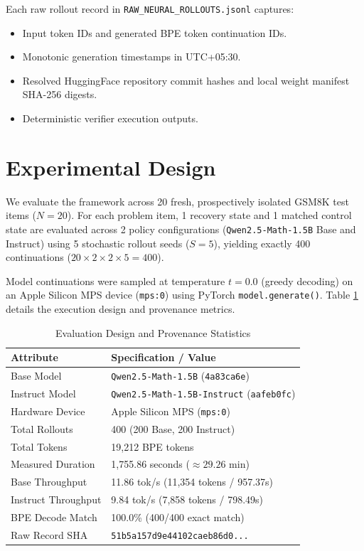 \documentclass[conference]{IEEEtran}
\begin{document}
Each raw rollout record in \texttt{RAW\_NEURAL\_ROLLOUTS.jsonl} captures:
\begin{itemize}
    \item Input token IDs and generated BPE token continuation IDs.
    \item Monotonic generation timestamps in UTC+05:30.
    \item Resolved HuggingFace repository commit hashes and local weight manifest SHA-256 digests.
    \item Deterministic verifier execution outputs.
\end{itemize}

\section{Experimental Design}
We evaluate the framework across 20 fresh, prospectively isolated GSM8K test items ($N=20$). For each problem item, 1 recovery state and 1 matched control state are evaluated across 2 policy configurations (\texttt{Qwen2.5-Math-1.5B} Base and Instruct) using 5 stochastic rollout seeds ($S=5$), yielding exactly 400 continuations ($20 \times 2 \times 2 \times 5 = 400$).

Model continuations were sampled at temperature $t=0.0$ (greedy decoding) on an Apple Silicon MPS device (\texttt{mps:0}) using PyTorch \texttt{model.generate()}. Table \ref{tab:provenance} details the execution design and provenance metrics.

\begin{table}[htbp]
\caption{Evaluation Design and Provenance Statistics}
\label{tab:provenance}
\centering
\begin{tabularx}{\columnwidth}{Xp{4.2cm}}
\toprule
\textbf{Attribute} & \textbf{Specification / Value} \\
\midrule
Base Model & \texttt{Qwen2.5-Math-1.5B} (\texttt{4a83ca6e}) \\
Instruct Model & \texttt{Qwen2.5-Math-1.5B-Instruct} (\texttt{aafeb0fc}) \\
Hardware Device & Apple Silicon MPS (\texttt{mps:0}) \\
Total Rollouts & 400 (200 Base, 200 Instruct) \\
Total Tokens & 19,212 BPE tokens \\
Measured Duration & 1,755.86 seconds ($\approx 29.26$ min) \\
Base Throughput & 11.86 tok/s (11,354 tokens / 957.37s) \\
Instruct Throughput & 9.84 tok/s (7,858 tokens / 798.49s) \\
BPE Decode Match & 100.0\% (400/400 exact match) \\
Raw Record SHA & \texttt{51b5a157d9e44102caeb86d0...} \\
\bottomrule
\end{tabularx}
\end{table}
\end{document}
